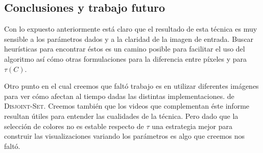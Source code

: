\subsection{Conclusiones y trabajo futuro}

Con lo expuesto anteriormente está claro que el resultado de esta técnica es
muy sensible a los parámetros dados y a la claridad de la imagen de entrada.
Buscar heurísticas para encontrar éstos es un camino posible para facilitar el
uso del algoritmo así cómo otras formulaciones para la diferencia entre píxeles
y para $\tau(C)$.

Otro punto en el cual creemos que faltó trabajo es en utilizar diferentes
imágenes para ver cómo afectan al tiempo dadas las distintas implementaciones.
de \textsc{Disjoint-Set}. Creemos también que los videos que complementan éste
informe resultan útiles para entender las cualidades de la técnica. Pero dado
que la selección de colores no es estable respecto de $\tau$ una estrategia
mejor para construir las visualizaciones variando los parámetros es algo que
creemos nos faltó.
